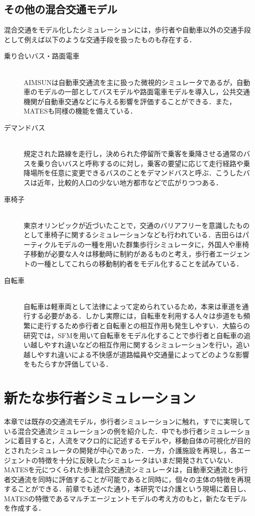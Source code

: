 \subsection{その他の混合交通モデル}

混合交通をモデル化したシミュレーションには，歩行者や自動車以外の交通手段として例えば以下のような交通手段を扱ったものも存在する．

\begin{description}
  \item[乗り合いバス・路面電車]\mbox{}\\
  AIMSUN\cite{dynamic_simulation}は自動車交通流を主に扱った微視的シミュレータであるが，自動車のモデルの一部としてバスモデルや路面電車モデルを導入し，公共交通機関が自動車交通などに与える影響を評価することができる．また，MATESも同様の機能を備えている．
  \item[デマンドバス]\mbox{}\\
  規定された路線を走行し，決められた停留所で乗客を乗降させる通常のバスを乗り合いバスと呼称するのに対し，乗客の要望に応じて走行経路や乗降場所を任意に変更できるバスのことをデマンドバスと呼ぶ．こうしたバスは近年，比較的人口の少ない地方都市などで広がりつつある．
  \item[車椅子]\mbox{}\\
  東京オリンピックが近づいたことで，交通のバリアフリーを意識したものとして車椅子に関するシミュレーションなども行われている．吉田らはパーティクルモデルの一種を用いた群集歩行シミュレータに，外国人や車椅子移動が必要な人々は移動時に制約があるものと考え，歩行者エージェントの一種としてこれらの移動制約者をモデル化することを試みている\cite{escape_simulation}．
  \item[自転車]\mbox{}\\
  自転車は軽車両として法律によって定められているため，本来は車道を通行する必要がある．しかし実際には，自転車を利用する人々は歩道をも頻繁に走行するため歩行者と自転車との相互作用も発生しやすい．大脇らの研究では，SFMを用いて自転車をモデル化することで歩行者と自転車の追い越しやすれ違いなどの相互作用に関するシミュレーションを行い，追い越しやすれ違いによる不快感が道路幅員や交通量によってどのような影響をもたらすか評価している\cite{necessity}．
\end{description}

\section{新たな歩行者シミュレーション}

本章では既存の交通流モデル，歩行者シミュレーションに触れ，すでに実現している混合交通流シミュレーションの例を紹介した．中でも歩行者シミュレーションに着目すると，人流をマクロ的に記述するモデルや，移動自体の可視化が目的とされたシミュレータの開発が中心であった．一方，介護施設を再現し，各エージェントの特徴を十分に反映したシミュレータはいまだ開発されていない．MATESを元につくられた歩車混合交通流シミュレータは，自動車交通流と歩行者交通流を同時に評価することが可能であると同時に，個々の主体の特徴を再現することができる．前章でも述べた通り，本研究では介護という現場に着目し、MATESの特徴であるマルチエージェントモデルの考え方のもと，新たなモデルを作成する．
